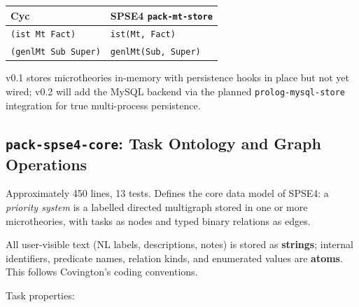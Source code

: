 \documentclass[11pt,letterpaper]{article}
\begin{document}
\begin{center}
\begin{tabular}{@{}ll@{}}
\toprule
Cyc & SPSE4 \texttt{pack-mt-store} \\
\midrule
\texttt{(ist Mt Fact)}        & \texttt{ist(Mt, Fact)} \\
\texttt{(genlMt Sub Super)}   & \texttt{genlMt(Sub, Super)} \\
\bottomrule
\end{tabular}
\end{center}

v0.1 stores microtheories in-memory with persistence hooks in place but
not yet wired; v0.2 will add the MySQL backend via the planned
\texttt{prolog-mysql-store} integration for true multi-process persistence.

\subsection{\texttt{pack-spse4-core}: Task Ontology and Graph Operations}
\label{sec:core}

Approximately 450 lines, 13 tests. Defines the core data model of SPSE4:
a \emph{priority system} is a labelled directed multigraph stored in one
or more microtheories, with tasks as nodes and typed binary relations as
edges.

All user-visible text (NL labels, descriptions, notes) is stored as
\textbf{strings}; internal identifiers, predicate names, relation kinds,
and enumerated values are \textbf{atoms}. This follows Covington's coding
conventions.

Task properties:
\end{document}
